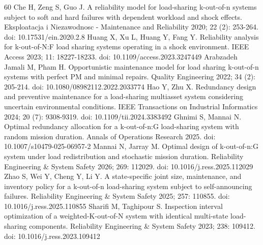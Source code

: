 \documentclass{elektr}
\begin{document}
\begin{thebibliography}{60}
 Che H, Zeng S, Guo J. A reliability model for load-sharing k-out-of-n systems subject to soft and hard failures with dependent workload and shock effects. Eksploatacja i Niezawodnosc - Maintenance and Reliability 2020; 22 (2): 253-264. doi: 10.17531/ein.2020.2.8
 Huang X, Xu L, Huang Y, Fang Y. Reliability analysis for k-out-of-N:F load sharing systems operating in a shock environment. IEEE Access 2023; 11: 18227-18233. doi: 10.1109/access.2023.3247449
 Arabzadeh Jamali M, Pham H. Opportunistic maintenance model for load sharing k-out-of-n systems with perfect PM and minimal repairs. Quality Engineering 2022; 34 (2): 205-214. doi: 10.1080/08982112.2022.2033774
 Hao Y, Zhu X. Redundancy design and preventive maintenance for a load-sharing multiasset system considering uncertain environmental conditions. IEEE Transactions on Industrial Informatics 2024; 20 (7): 9308-9319. doi: 10.1109/tii.2024.3383492
 Ghnimi S, Mannai N. Optimal redundancy allocation for a k-out-of-n:G load-sharing system with random mission duration. Annals of Operations Research 2025. doi: 10.1007/s10479-025-06957-2
 Mannai N, Jarray M. Optimal design of k-out-of-n:G system under load redistribution and stochastic mission duration. Reliability Engineering \& System Safety 2026; 269: 112029. doi: 10.1016/j.ress.2025.112029
 Zhao S, Wei Y, Cheng Y, Li Y. A state-specific joint size, maintenance, and inventory policy for a k-out-of-n load-sharing system subject to self-announcing failures. Reliability Engineering \& System Safety 2025; 257: 110855. doi: 10.1016/j.ress.2025.110855
 Sharifi M, Taghipour S. Inspection interval optimization of a weighted-K-out-of-N system with identical multi-state load-sharing components. Reliability Engineering \& System Safety 2023; 238: 109412. doi: 10.1016/j.ress.2023.109412
\end{thebibliography}
\end{document}
